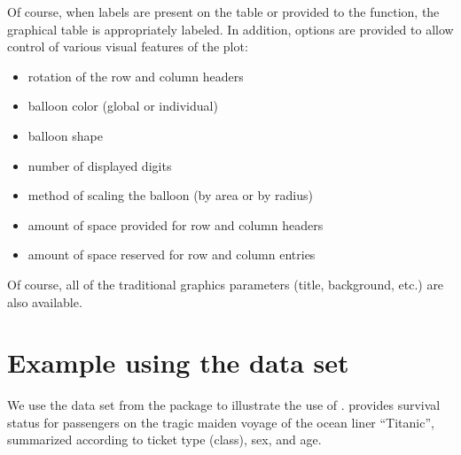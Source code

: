 \documentclass[a4paper]{report}
\begin{document}
\begin{article}
Of course, when labels are present on the table or provided to the
function, the graphical table is appropriately labeled.  In
addition, options are provided to allow control of various visual features
of the plot:
\begin{itemize}
  \item rotation of the row and column headers
  \item balloon color (global or individual) 
  \item balloon shape 
  \item number of displayed digits
  \item method of scaling the balloon (by area or by radius)
  \item amount of space provided for row and column headers
  \item amount of space reserved for row and column entries
\end{itemize}
Of course, all of the traditional graphics parameters (title,
background, etc.) are also available.


\section*{Example using the  data set}

We use the  data set from the  package
to illustrate the use of .  
provides survival status for passengers on the tragic maiden voyage
of the ocean liner ``Titanic'', summarized according to ticket type
(class), sex, and age.





\end{article}
\end{document}
